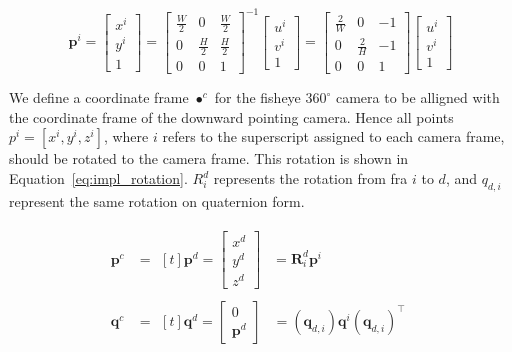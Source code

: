 \begin{equation}
    \mathbf{p}^i = \begin{bmatrix}
        x^i \\ y^i \\ 1
    \end{bmatrix} = \begin{bmatrix}
        \frac{W}{2} & 0 & \frac{W}{2} \\
        0 & \frac{H}{2} & \frac{H}{2} \\
        0 & 0 & 1
    \end{bmatrix}^{-1}\begin{bmatrix}
        u^i \\ v^i \\ 1
    \end{bmatrix} = \begin{bmatrix}
        \frac{2}{W} & 0 & -1 \\
        0 & \frac{2}{H} & -1 \\
        0 & 0 & 1
    \end{bmatrix}\begin{bmatrix}
        u^i \\ v^i \\ 1
    \end{bmatrix}
    \label{eq:impl_pixel_inverse_transform}
\end{equation}

We define a coordinate frame $\bullet^c$ for the fisheye $360^\circ$ camera to be alligned with the coordinate frame of the downward pointing camera. Hence all points $p^i = [x^i,y^i,z^i]$, where $i$ refers to the superscript assigned to each camera frame, should be rotated to the camera frame. This rotation is shown in Equation~\eqref{eq:impl_rotation}. $R^d_i$ represents the rotation from fra $i$ to $d$, and $q_{d,i}$ represent the same rotation on quaternion form.

\begin{subequations}
    \begin{align}
        \mathbf{p}^c &= \!\begin{aligned}[t]
            \mathbf{p}^d = \begin{bmatrix} x^d \\ y^d \\ z^d \end{bmatrix} &= \mathbf{R}^d_i \mathbf{p}^i
        \end{aligned} \label{eq:impl_rotation_R} \\[0.75ex]
        \mathbf{q}^c &= \!\begin{aligned}[t]
            \mathbf{q}^d = \begin{bmatrix} 0 \\ \mathbf{p}^d \end{bmatrix} &= (\mathbf{q}_{d,i})\mathbf{q}^i(\mathbf{q}_{d,i})^\top
        \end{aligned} \label{eq:impl_rotation_q}
    \end{align}
    \label{eq:impl_rotation}
\end{subequations}

